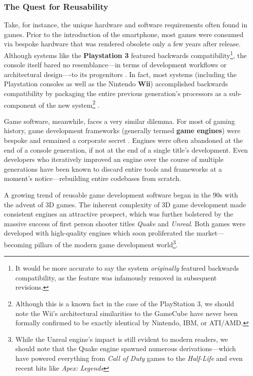 \documentclass{report}
\newcommand{\tech}[1]{\textbf{#1}}
\begin{document}
\subsubsection{The Quest for Reusability}
Take, for instance, the unique hardware and software requirements often found in games. Prior to the introduction of the smartphone, most games were consumed via bespoke hardware that was rendered obsolete only a few years after release. Although systems like the \tech{Playstation 3} featured backwards compatibility\footnote{It would be more accurate to say the system \emph{originally} featured backwards compatibility, as the feature was infamously removed in subsequent revisions.}, the console itself bared no resemblance---in terms of development workflows or architectural design----to its progenitors \cite{Kuchera_2009}. In fact, most systems (including the Playstation consoles as well as the Nintendo \tech{Wii}) accomplished backwards compatibility by packaging the entire previous generation's processors as a sub-component of the new system\footnote{Although this is a known fact in the case of the PlayStation 3, we should note the Wii's architectural similarities to the GameCube have never been formally confirmed to be exactly identical by Nintendo, IBM, or ATI/AMD.} \cite{Copetti_2021} \cite{Copetti_2020}. 

Game software, meanwhile, faces a very similar dilemma. For most of gaming history, game development frameworks (generally termed \tech{game engines}) were bespoke and remained a corporate secret \cite{gregory2018game}. Engines were often abandoned at the end of a console generation, if not at the end of a single title's development. Even developers who iteratively improved an engine over the course of multiple generations have been known to discard entire tools and frameworks at a moment's notice---rebuilding entire codebases from scratch.  

A growing trend of reusable game development software began in the 90s with the advent of 3D games. The inherent complexity of 3D game development made consistent engines an attractive prospect, which was further bolstered by the massive success of first person shooter titles \emph{Quake} and \emph{Unreal}. Both games were developed with high-quality engines which soon proliferated the market---becoming pillars of the modern game development world\footnote{While the Unreal engine's impact is still evident to modern readers, we should note that the Quake engine spawned numerous derivations---which have powered everything from \emph{Call of Duty} games to the \emph{Half-Life} and even recent hits like \emph{Apex: Legends}}.
\end{document}
